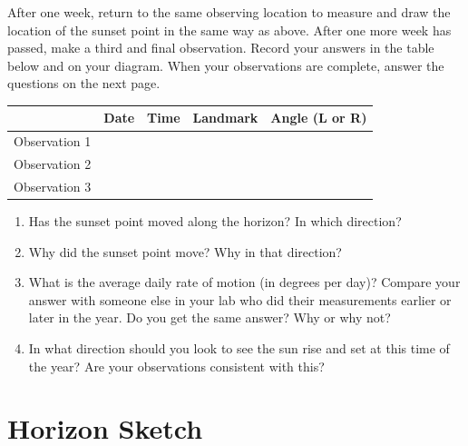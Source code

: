 \documentclass[11pt]{article}
\begin{document}
After one week, return to the same observing location to measure and draw the
location of the sunset point in the same way as above. After one more week has
passed, make a third and final observation. Record your answers in the table
below and on your diagram. When your observations are complete, answer the
questions on the next page.

\begin{center}
\begin{tabular}{|l|l|l|l|l|}
\hline & \parbox[b]{2cm}{\textbf{Date}} & \parbox[b]{2cm}{\textbf{Time}} \quad & \parbox[b]{4cm}{\textbf{Landmark}} & \parbox[b]{3cm}{\textbf{Angle (L or R)}} \\\hline
Observation 1 & \parbox{1cm}{\vspace*{1.7cm}} & & & \\\hline
Observation 2 & \parbox{1cm}{\vspace*{1.7cm}}& & & \\\hline
Observation 3 & \parbox{1cm}{\vspace*{1.7cm}}& & & \\\hline
\end{tabular}
\end{center}


\begin{enumerate}
\item Has the sunset point moved along the horizon?  In which direction?
\vspace*{4cm}

\hrulefill

\item Why did the sunset point move? Why in that direction?
\vspace*{4cm}

\hrulefill
\newpage
\item What is the average daily rate of motion (in degrees per day)? Compare your answer with someone else in your lab who did their measurements earlier or later in the year. Do you get the same answer? Why or why not?

\vspace*{4cm}

\hrulefill

\item In what direction should you look to see the sun rise and set at this
time of the year? Are your observations consistent with this?

\vspace*{4cm}

\hrulefill

\end{enumerate}

\newpage
\section*{Horizon Sketch}
\end{document}
